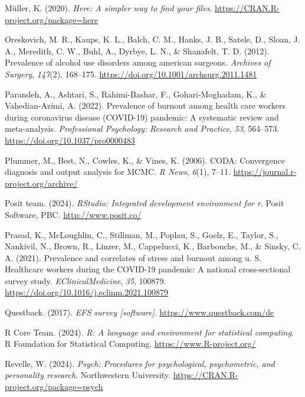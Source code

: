 \documentclass[
  man]{apa6}
\newlength{\cslhangindent}
\newenvironment{CSLReferences}[2] %
 {\begin{list}{}{%
  \setlength{\itemindent}{0pt}
  \setlength{\leftmargin}{0pt}
  \setlength{\parsep}{0pt}
  \ifodd #1
   \setlength{\leftmargin}{\cslhangindent}
   \setlength{\itemindent}{-1\cslhangindent}
  \fi
  \setlength{\itemsep}{#2\baselineskip}}}
 {\end{list}}
\begin{document}
\begin{CSLReferences}{1}{0}
Müller, K. (2020). \emph{Here: A simpler way to find your files}. \url{https://CRAN.R-project.org/package=here}

Oreskovich, M. R., Kaups, K. L., Balch, C. M., Hanks, J. B., Satele, D., Sloan, J. A., Meredith, C. W., Buhl, A., Dyrbye, L. N., \& Shanafelt, T. D. (2012). Prevalence of alcohol use disorders among american surgeons. \emph{Archives of Surgery}, \emph{147}(2), 168--175. \url{https://doi.org/10.1001/archsurg.2011.1481}

Parandeh, A., Ashtari, S., Rahimi-Bashar, F., Gohari-Moghadam, K., \& Vahedian-Azimi, A. (2022). Prevalence of burnout among health care workers during coronavirus disease ({COVID-19}) pandemic: A systematic review and meta-analysis. \emph{Professional Psychology: Research and Practice}, \emph{53}, 564--573. \url{https://doi.org/10.1037/pro0000483}

Plummer, M., Best, N., Cowles, K., \& Vines, K. (2006). CODA: Convergence diagnosis and output analysis for MCMC. \emph{R News}, \emph{6}(1), 7--11. \url{https://journal.r-project.org/archive/}

Posit team. (2024). \emph{RStudio: Integrated development environment for r}. Posit Software, PBC. \url{http://www.posit.co/}

Prasad, K., McLoughlin, C., Stillman, M., Poplau, S., Goelz, E., Taylor, S., Nankivil, N., Brown, R., Linzer, M., Cappelucci, K., Barbouche, M., \& Sinsky, C. A. (2021). Prevalence and correlates of stress and burnout among u. S. Healthcare workers during the COVID-19 pandemic: A national cross-sectional survey study. \emph{EClinicalMedicine}, \emph{35}, 100879. \url{https://doi.org/10.1016/j.eclinm.2021.100879}

Questback. (2017). \emph{EFS survey {[}software{]}}. \url{https://www.questback.com/de}

R Core Team. (2024). \emph{R: A language and environment for statistical computing}. R Foundation for Statistical Computing. \url{https://www.R-project.org/}

Revelle, W. (2024). \emph{Psych: Procedures for psychological, psychometric, and personality research}. Northwestern University. \url{https://CRAN.R-project.org/package=psych}


\end{CSLReferences}
\end{document}
